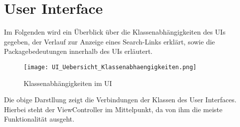
\chapter{User Interface}

Im Folgenden wird ein Überblick über die Klassenabhängigkeiten des UIs gegeben, der Verlauf zur Anzeige eines Search-Links erklärt, sowie die Packagebedeutungen innerhalb des UIs erläutert.

\begin{figure}[h]
	\centering
	\texttt{[image: UI\_Uebersicht\_Klassenabhaengigkeiten.png]}
	\caption{Klassenabhängigkeiten im UI}
	\label{fig:Klassenabhängigkeiten}
\end{figure}

Die obige Darstllung zeigt die Verbindungen der Klassen des User Interfaces. Hierbei steht der ViewController im Mittelpunkt, da von ihm die meiste Funktionalität ausgeht.


\newpage

\newpage

\newpage

\newpage

\newpage


